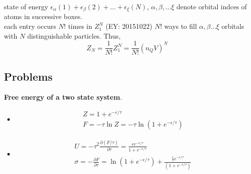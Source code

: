 state of energy $\epsilon_{\alpha}(1) + \epsilon_{\beta}(2) + \dots + \epsilon_{\xi}(N)$, $\alpha, \beta, \dots \xi$ denote orbital indces of atoms in successive boxes.  \\
each entry occurs $N!$ times in $Z_1^N$ (EY: 20151022) $N!$ ways to fill $\alpha, \beta \dots \xi$ orbitals with $N$ distinguishable particles.  Thus,
\[
Z_N = \frac{1}{N!} Z_1^N = \frac{1}{N!} (n_Q V)^N
\]


\subsection*{Problems}

 \textbf{Free energy of a two state system}.  \begin{itemize}
\item[(a)] 
\[
\begin{gathered}
  Z = 1 + e^{-\epsilon/\tau} \\
  F = -\tau \ln{Z} = -\tau \ln{ ( 1 + e^{-\epsilon/\tau} ) }
\end{gathered}
\]
\item[(b)] 
\[
\begin{gathered}
  U = - \tau^2 \frac{ \partial (F/\tau )}{ \partial \tau} = \frac{ \epsilon e^{-\epsilon/\tau } }{ 1 + e^{-\epsilon/\tau} } \\
  \sigma = - \frac{ \partial F}{\partial \tau} = \ln{ ( 1 + e^{-\epsilon/\tau} ) } + \frac{ \frac{ \epsilon }{\tau} e^{-\epsilon/\tau } }{ ( 1 + e^{-\epsilon/\tau } ) }
\end{gathered}
\]
\end{itemize}





